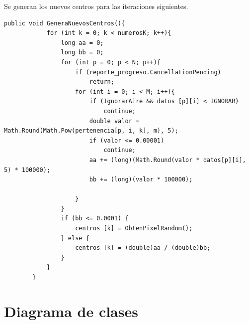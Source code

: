 \documentclass[12pt]{report}
\begin{document}
\newpage
\vspace*{2cm}
Se generan los nuevos centros para las iteraciones siguientes.
\lstset{language=C, breaklines=true, basicstyle=\footnotesize}
\lstset{numbers=left, numberstyle=\tiny, stepnumber=1, numbersep=-2pt}
\begin{lstlisting}[frame=single]
	public void GeneraNuevosCentros(){
            for (int k = 0; k < numerosK; k++){
                long aa = 0;
                long bb = 0;
                for (int p = 0; p < N; p++){
                    if (reporte_progreso.CancellationPending)
                        return;
                    for (int i = 0; i < M; i++){
                        if (IgnorarAire && datos [p][i] < IGNORAR)
                            continue;
                        double valor = Math.Round(Math.Pow(pertenencia[p, i, k], m), 5);
                        if (valor <= 0.00001)
                            continue;
                        aa += (long)(Math.Round(valor * datos[p][i], 5) * 100000);
                        bb += (long)(valor * 100000);
                        
                    }
                }
                if (bb <= 0.0001) {
                    centros [k] = ObtenPixelRandom();
                } else {
                    centros [k] = (double)aa / (double)bb;
                }
            }
        }
\end{lstlisting}

\chapter{Diagrama de clases}
\end{document}
